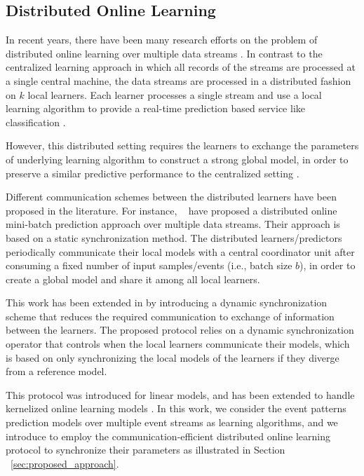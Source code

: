 
\subsection{Distributed Online Learning}

\par In recent years, there have been many research efforts on the problem of distributed online learning over multiple data streams \cite{tekin2014distributed,yan2013distributed,canzian2015ensemble,zhang2014fast,dekel2012optimal,kamp2014communication}.   In contrast to the centralized learning approach in which all records of the streams are processed at a single central machine, the data streams are processed in a distributed fashion on $k$ local learners. Each learner processes a single stream and use a local learning algorithm to provide a real-time prediction based service like classification \cite{canzian2015ensemble}.  

\par However, this distributed setting requires the learners to exchange the parameters of underlying learning algorithm to construct a strong global model, in order to preserve a similar predictive performance to the centralized setting \cite{kamp2014communication}. 

\par Different communication schemes between the distributed learners have been proposed in the literature. For instance, ~\citet{dekel2012optimal} have proposed a distributed online mini-batch prediction approach over multiple data streams. Their approach is based on a static synchronization method. The distributed learners/predictors periodically communicate  their local models with a central coordinator unit after consuming a fixed number of input samples/events (i.e., batch size $b$), in order to  create a global model  and share it among all local learners. 

\par This work has been extended in \cite{kamp2014communication} by introducing a dynamic synchronization scheme that reduces the required communication to  exchange of information between the learners. The proposed protocol relies on a dynamic synchronization operator that controls when the local learners communicate their models, which is based on only synchronizing the local models of the learners if they diverge from a reference model. 
 
\par This protocol was introduced for linear models, and has been extended to handle kernelized online learning models \cite{kamp2016communication}. In this work, we consider the event patterns prediction models over multiple event streams as learning algorithms, and we introduce to employ the communication-efficient distributed online learning protocol \cite{kamp2014communication} to synchronize their parameters as illustrated in Section ~\ref{sec:proposed_approach}. 
